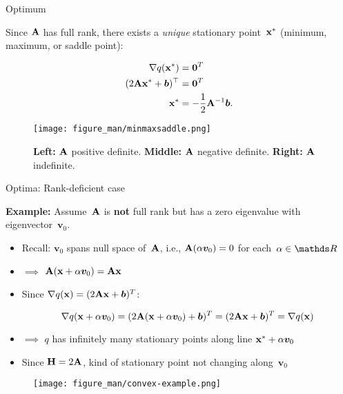 \documentclass[11pt,compress,t,notes=noshow, xcolor=table]{beamer}
\begin{document}
\begin{vbframe}{Optimum}

Since $\mathbf{A}$ has full rank, there exists a \textit{unique} stationary point~$\mathbf{x}^\ast$ (minimum, maximum, or saddle point):

\vspace{-\baselineskip}

\begin{align*}
    \nabla q(\mathbf{x}^\ast) &= \boldsymbol{0}^T \\
    (2 \mathbf{A} \mathbf{x}^\ast + \bm{b})^\top &= \boldsymbol{0}^T \\
    \mathbf{x}^\ast &= -\frac{1}{2} \mathbf{A}^{-1} \bm{b}.
\end{align*}  

\vspace{-0.5\baselineskip}

\begin{figure}
    \centering
    \texttt{[image: figure\_man/minmaxsaddle.png]}
    \caption*{
        \footnotesize
        \textbf{Left:} $\mathbf{A}$ positive definite.
        \textbf{Middle:} $\mathbf{A}$ negative definite.
        \textbf{Right:} $\mathbf{A}$ indefinite.}
\end{figure}

\end{vbframe}

\begin{vbframe}{Optima: Rank-deficient case}

\footnotesize

\textbf{Example:} Assume~$\mathbf{A}$ is \textbf{not} full rank but has a zero eigenvalue with eigenvector~$\bm{v}_0$.

\begin{itemize}
    \item Recall: $\bm{v}_0$ spans null space of~$\mathbf{A}$, i.e., $\mathbf{A}(\alpha\bm{v}_0) = 0$ for each~$\alpha\in\R$
    \item $\implies$ $\mathbf{A}(\mathbf{x} + \alpha\bm{v}_0) = \mathbf{A}\mathbf{x}$
    \item Since $\nabla q(\mathbf{x}) = (2\mathbf{A}\mathbf{x} + \bm{b})^T$:
        
        \vspace{-0.5\baselineskip}
        
        \begin{equation*}
            \nabla q(\mathbf{x}+\alpha\bm{v}_0) = (2\mathbf{A}(\mathbf{x}+\alpha\bm{v}_0)+\bm{b})^T = (2\mathbf{A}\mathbf{x}+\bm{b})^T = \nabla q(\mathbf{x})
        \end{equation*}
    \item $\implies$ $q$ has infinitely many stationary points along line $\mathbf{x}^\ast+\alpha\bm{v}_0$
    \item Since $\mathbf{H} = 2\mathbf{A}$, kind of stationary point not changing along~$\bm{v}_0$
\end{itemize}

\begin{figure}
    \centering
    \texttt{[image: figure\_man/convex-example.png]}
\end{figure}

\end{vbframe}

\endlecture
\end{document}

